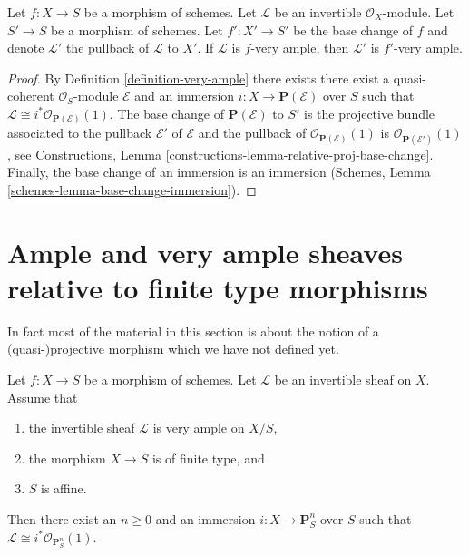 \begin{lemma}
\label{lemma-very-ample-base-change}
Let $f : X \to S$ be a morphism of schemes.
Let $\mathcal{L}$ be an invertible $\mathcal{O}_X$-module.
Let $S' \to S$ be a morphism of schemes.
Let $f' : X' \to S'$ be the base change of $f$ and denote
$\mathcal{L}'$ the pullback of $\mathcal{L}$ to $X'$.
If $\mathcal{L}$ is $f$-very ample, then $\mathcal{L}'$ is $f'$-very ample.
\end{lemma}

\begin{proof}
By Definition \ref{definition-very-ample} there exists there exist a
quasi-coherent $\mathcal{O}_S$-module $\mathcal{E}$ and an immersion
$i : X \to \mathbf{P}(\mathcal{E})$ over $S$ such that
$\mathcal{L} \cong i^*\mathcal{O}_{\mathbf{P}(\mathcal{E})}(1)$.
The base change of $\mathbf{P}(\mathcal{E})$ to $S'$ is
the projective bundle associated to the pullback $\mathcal{E}'$
of $\mathcal{E}$ and the pullback of
$\mathcal{O}_{\mathbf{P}(\mathcal{E})}(1)$
is
$\mathcal{O}_{\mathbf{P}(\mathcal{E}')}(1)$, see
Constructions, Lemma \ref{constructions-lemma-relative-proj-base-change}.
Finally, the base change
of an immersion is an immersion
(Schemes, Lemma \ref{schemes-lemma-base-change-immersion}).
\end{proof}







\section{Ample and very ample sheaves relative to finite type morphisms}
\label{section-ample-finite-type}

\noindent
In fact most of the material in this section is about the notion of
a (quasi-)projective morphism which we have not defined yet.

\begin{lemma}
\label{lemma-very-ample-finite-type-over-affine}
Let $f : X \to S$ be a morphism of schemes.
Let $\mathcal{L}$ be an invertible sheaf on $X$.
Assume that
\begin{enumerate}
\item the invertible sheaf $\mathcal{L}$ is very ample on $X/S$,
\item the morphism $X \to S$ is of finite type, and
\item $S$ is affine.
\end{enumerate}
Then there exist an $n \geq 0$ and an immersion
$i : X \to \mathbf{P}^n_S$ over $S$ such that
$\mathcal{L} \cong i^*\mathcal{O}_{\mathbf{P}^n_S}(1)$.
\end{lemma}

